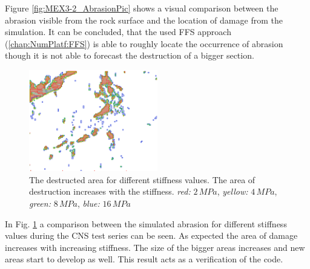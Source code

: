Figure \ref{fig:MEX3-2_AbrasionPic} shows a visual comparison between the abrasion visible from the rock surface and the location of damage from the simulation. It can be concluded, that the used FFS approach (\ref{chap:NumPlatf:FFS}) is able to roughly locate the occurrence of abrasion though it is not able to forecast the destruction of a bigger section.

\begin{figure}[!ht]
\begin{center}
\includegraphics[width=0.5\textwidth]{./figures/MEX3-2_AbrasionDiffStiffness.PNG}
\end{center}
\caption{The destructed area for different stiffness values. The area of destruction increases with the stiffness. \textit{red:} $2\, \unit{MPa}$, \textit{yellow:} $4\, \unit{MPa}$, \textit{green:} $8\, \unit{MPa}$, \textit{blue:} $16\,\unit{MPa}$}
\label{fig:MEX3-2_AbrasionStiffness}
\end{figure}

In Fig. \ref{fig:MEX3-2_AbrasionStiffness} a comparison between the simulated abrasion for different stiffness values during the CNS test series can be seen. As expected the area of damage increases with increasing stiffness. The size of the bigger areas increases and new areas start to develop as well. This result acts as a verification of the code.

